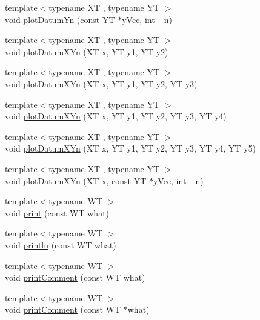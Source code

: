 \begin{DoxyCompactItemize}
{\footnotesize template$<$typename X\+T , typename Y\+T $>$ }\\void \hyperlink{class_serial_graph_aa20b03efac52c18c50efc79c6459a9fc}{plot\+Datum\+Yn} (const Y\+T $\ast$y\+Vec, int \+\_\+n)
\item 
{\footnotesize template$<$typename X\+T , typename Y\+T $>$ }\\void \hyperlink{class_serial_graph_a79b721ca2be68969862869f96d6a6305}{plot\+Datum\+X\+Yn} (X\+T x, Y\+T y1, Y\+T y2)
\item 
{\footnotesize template$<$typename X\+T , typename Y\+T $>$ }\\void \hyperlink{class_serial_graph_a9fcea879f299a7d24be4ff9a38c53c26}{plot\+Datum\+X\+Yn} (X\+T x, Y\+T y1, Y\+T y2, Y\+T y3)
\item 
{\footnotesize template$<$typename X\+T , typename Y\+T $>$ }\\void \hyperlink{class_serial_graph_afd854b631604abe2014a1bb1beeeec52}{plot\+Datum\+X\+Yn} (X\+T x, Y\+T y1, Y\+T y2, Y\+T y3, Y\+T y4)
\item 
{\footnotesize template$<$typename X\+T , typename Y\+T $>$ }\\void \hyperlink{class_serial_graph_aa1bb6fa08a8bd06c074ac2a02b3f6fbc}{plot\+Datum\+X\+Yn} (X\+T x, Y\+T y1, Y\+T y2, Y\+T y3, Y\+T y4, Y\+T y5)
\item 
{\footnotesize template$<$typename X\+T , typename Y\+T $>$ }\\void \hyperlink{class_serial_graph_a3d7276c89235dc1aa176e2439ad9835b}{plot\+Datum\+X\+Yn} (X\+T x, const Y\+T $\ast$y\+Vec, int \+\_\+n)
\item 
{\footnotesize template$<$typename W\+T $>$ }\\void \hyperlink{class_serial_graph_aa72b48968e82a953dcdc6522bd04c7b4}{print} (const W\+T what)
\item 
{\footnotesize template$<$typename W\+T $>$ }\\void \hyperlink{class_serial_graph_a2005d103cb5a578053ef7838b3a8422d}{println} (const W\+T what)
\item 
{\footnotesize template$<$typename W\+T $>$ }\\void \hyperlink{class_serial_graph_a7237d928f67a14d5c9950d8c23c2a794}{print\+Comment} (const W\+T what)
\item 
{\footnotesize template$<$typename W\+T $>$ }\\void \hyperlink{class_serial_graph_a9b40aa22335fc26a6c29b16d278b26f8}{print\+Comment} (const W\+T $\ast$what)
\end{DoxyCompactItemize}
